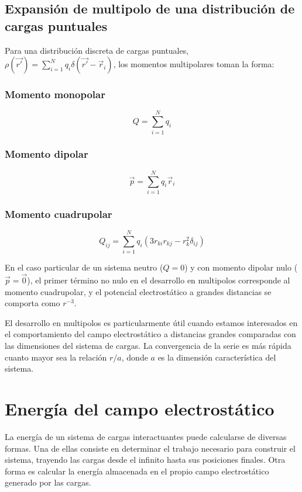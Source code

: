 \documentclass[12pt,a4paper]{book}
\begin{document}
\subsection{Expansión de multipolo de una distribución de cargas puntuales}

Para una distribución discreta de cargas puntuales, $\rho(\vec{r'}) = \sum_{i=1}^{N} q_i \delta(\vec{r'} - \vec{r}_i)$, los momentos multipolares toman la forma:

\subsubsection{Momento monopolar}
\begin{equation}
Q = \sum_{i=1}^{N} q_i
\end{equation}

\subsubsection{Momento dipolar}
\begin{equation}
\vec{p} = \sum_{i=1}^{N} q_i \vec{r}_i
\end{equation}

\subsubsection{Momento cuadrupolar}
\begin{equation}
Q_{ij} = \sum_{i=1}^{N} q_i (3r_{ki} r_{kj} - r_k^2\delta_{ij})
\end{equation}

En el caso particular de un sistema neutro ($Q = 0$) y con momento dipolar nulo ($\vec{p} = \vec{0}$), el primer término no nulo en el desarrollo en multipolos corresponde al momento cuadrupolar, y el potencial electrostático a grandes distancias se comporta como $r^{-3}$.

El desarrollo en multipolos es particularmente útil cuando estamos interesados en el comportamiento del campo electrostático a distancias grandes comparadas con las dimensiones del sistema de cargas. La convergencia de la serie es más rápida cuanto mayor sea la relación $r/a$, donde $a$ es la dimensión característica del sistema.

\section{Energía del campo electrostático}

La energía de un sistema de cargas interactuantes puede calcularse de diversas formas. Una de ellas consiste en determinar el trabajo necesario para construir el sistema, trayendo las cargas desde el infinito hasta sus posiciones finales. Otra forma es calcular la energía almacenada en el propio campo electrostático generado por las cargas.
\end{document}
